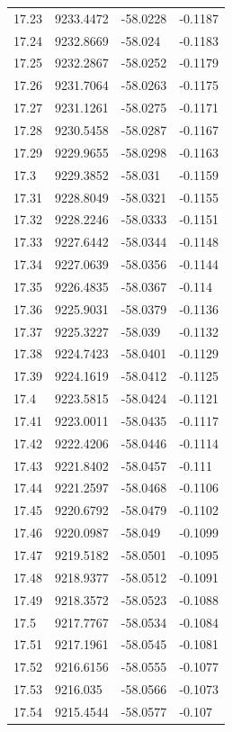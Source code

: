 \begin{table}[H]
\begin{tabular}{llll}
17.23 & 9233.4472 & -58.0228 & -0.1187 \\
17.24 & 9232.8669 & -58.024 & -0.1183 \\
17.25 & 9232.2867 & -58.0252 & -0.1179 \\
17.26 & 9231.7064 & -58.0263 & -0.1175 \\
17.27 & 9231.1261 & -58.0275 & -0.1171 \\
17.28 & 9230.5458 & -58.0287 & -0.1167 \\
17.29 & 9229.9655 & -58.0298 & -0.1163 \\
17.3 & 9229.3852 & -58.031 & -0.1159 \\
17.31 & 9228.8049 & -58.0321 & -0.1155 \\
17.32 & 9228.2246 & -58.0333 & -0.1151 \\
17.33 & 9227.6442 & -58.0344 & -0.1148 \\
17.34 & 9227.0639 & -58.0356 & -0.1144 \\
17.35 & 9226.4835 & -58.0367 & -0.114 \\
17.36 & 9225.9031 & -58.0379 & -0.1136 \\
17.37 & 9225.3227 & -58.039 & -0.1132 \\
17.38 & 9224.7423 & -58.0401 & -0.1129 \\
17.39 & 9224.1619 & -58.0412 & -0.1125 \\
17.4 & 9223.5815 & -58.0424 & -0.1121 \\
17.41 & 9223.0011 & -58.0435 & -0.1117 \\
17.42 & 9222.4206 & -58.0446 & -0.1114 \\
17.43 & 9221.8402 & -58.0457 & -0.111 \\
17.44 & 9221.2597 & -58.0468 & -0.1106 \\
17.45 & 9220.6792 & -58.0479 & -0.1102 \\
17.46 & 9220.0987 & -58.049 & -0.1099 \\
17.47 & 9219.5182 & -58.0501 & -0.1095 \\
17.48 & 9218.9377 & -58.0512 & -0.1091 \\
17.49 & 9218.3572 & -58.0523 & -0.1088 \\
17.5 & 9217.7767 & -58.0534 & -0.1084 \\
17.51 & 9217.1961 & -58.0545 & -0.1081 \\
17.52 & 9216.6156 & -58.0555 & -0.1077 \\
17.53 & 9216.035 & -58.0566 & -0.1073 \\
17.54 & 9215.4544 & -58.0577 & -0.107 \\

\end{tabular}
\end{table}
